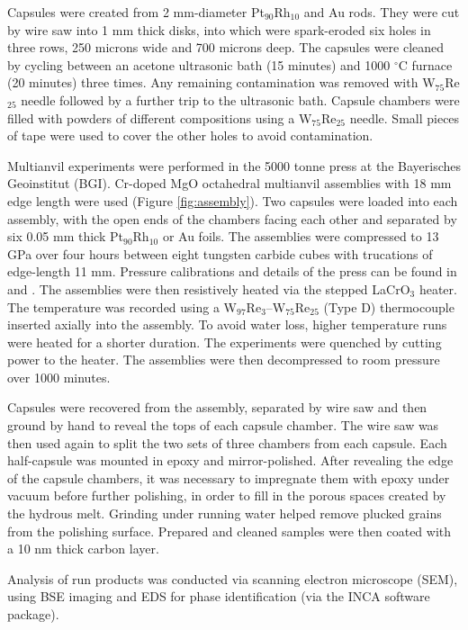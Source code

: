 \documentclass[review]{elsarticle}
\begin{document}
Capsules were created from 2 mm-diameter Pt$_{90}$Rh$_{10}$ and Au rods. They were cut by wire saw into 1 mm thick disks, into which were spark-eroded six holes in three rows, 250 microns wide and 700 microns deep. The capsules were cleaned by cycling between an acetone ultrasonic bath (15 minutes) and 1000 $^{\circ}$C furnace (20 minutes) three times. Any remaining contamination was removed with W$_{75}$Re$_{25}$ needle followed by a further trip to the ultrasonic bath. Capsule chambers were filled with powders of different compositions using a W$_{75}$Re$_{25}$ needle. Small pieces of tape were used to cover the other holes to avoid contamination. 

Multianvil experiments were performed in the 5000 tonne press at the Bayerisches Geoinstitut (BGI). Cr-doped MgO octahedral multianvil assemblies with 18 mm edge length were used (Figure \ref{fig:assembly}). Two capsules were loaded into each assembly, with the open ends of the chambers facing each other and separated by six 0.05 mm thick Pt$_{90}$Rh$_{10}$ or Au foils. The assemblies were compressed to 13 GPa over four hours between eight tungsten carbide cubes with trucations of edge-length 11 mm. Pressure calibrations and details of the press can be found in \cite{FPTLDR2004} and \cite{KF2005}. The assemblies were then resistively heated via the stepped LaCrO$_3$ heater. The temperature was recorded using a W$_{97}$Re$_{3}$--W$_{75}$Re$_{25}$ (Type D) thermocouple inserted axially into the assembly. To avoid water loss, higher temperature runs were heated for a shorter duration. The experiments were quenched by cutting power to the heater. The assemblies were then decompressed to room pressure over 1000 minutes. 

Capsules were recovered from the assembly, separated by wire saw and then ground by hand to reveal the tops of each capsule chamber. The wire saw was then used again to split the two sets of three chambers from each capsule. Each half-capsule was mounted in epoxy and mirror-polished. After revealing the edge of the capsule chambers, it was necessary to impregnate them with epoxy under vacuum before further polishing, in order to fill in the porous spaces created by the hydrous melt. Grinding under running water helped remove plucked grains from the polishing surface. Prepared and cleaned samples were then coated with a 10 nm thick carbon layer.

Analysis of run products was conducted via scanning electron microscope (SEM), using BSE imaging and EDS for phase identification (via the INCA software package). 
\end{document}
